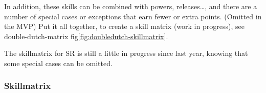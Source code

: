 In addition, these skills can be combined with powers, releases\dots, and there are a number of special cases or exceptions that earn fewer or extra points. (Omitted in the MVP)
Put it all together, to create a skill matrix (work in progress), see double-dutch-matrix fig\ref{fig:doubledutch-skillmatrix}.

The skillmatrix for SR is still a little in progress since last year, knowing that some special cases can be omitted.


    

\subsubsection{Skillmatrix}

